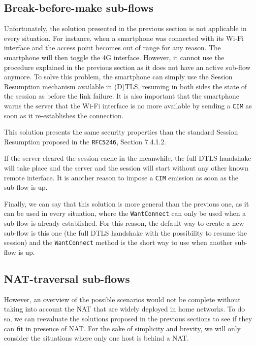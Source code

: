 \subsection{Break-before-make sub-flows\label{sec:breakbeforemake}}
Unfortunately, the solution presented in the previous section is not applicable in every situation. For instance, when a smartphone was connected with its Wi-Fi interface and the access point becomes out of range for any reason. The smartphone will then toggle the 4G interface. However, it cannot use the procedure explained in the previous section as it does not have an active sub-flow anymore. To solve this problem, the smartphone can simply use the Session Resumption mechanism available in (D)TLS, resuming in both sides the state of the session as before the link failure. It is also important that the smartphone warns the server that the Wi-Fi interface is no more available by sending a \verb!CIM! as soon as it re-establishes the connection. 

This solution presents the same security properties than the standard Session Resumption proposed in the \verb!RFC5246!\cite{rfc5246}, Section 7.4.1.2. 

If the server cleared the session cache in the meanwhile, the full DTLS handshake will take place and the server and the session will start without any other known remote interface. It is another reason to impose a \verb!CIM! emission as soon as the sub-flow is up.

Finally, we can say that this solution is more general than the previous one, as it can be used in every situation, where the \verb!WantConnect! can only be used when a sub-flow is already established. For this reason, the default way to create a new sub-flow is this one (the full DTLS handshake with the possibility to resume the session) and the \verb!WantConnect! method is the short way to use when another sub-flow is up.

\subsection{NAT-traversal sub-flows}

However, an overview of the possible scenarios would not be complete without taking into account the NAT that are widely deployed in home networks. To do so, we can reevaluate the solutions proposed in the previous sections to see if they can fit in presence of NAT. For the sake of simplicity and brevity, we will only consider the situations where only one host is behind a NAT.

